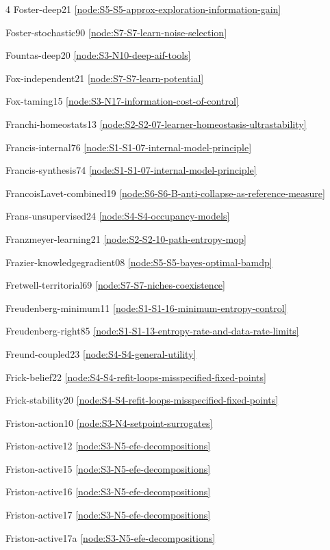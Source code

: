 \documentclass[10pt]{article}
\begin{document}
{\begin{multicols}{4}
Foster-deep21 \hfill \ref{node:S5-S5-approx-exploration-information-gain}\par
Foster-stochastic90 \hfill \ref{node:S7-S7-learn-noise-selection}\par
Fountas-deep20 \hfill \ref{node:S3-N10-deep-aif-tools}\par
Fox-independent21 \hfill \ref{node:S7-S7-learn-potential}\par
Fox-taming15 \hfill \ref{node:S3-N17-information-cost-of-control}\par
Franchi-homeostats13 \hfill \ref{node:S2-S2-07-learner-homeostasis-ultrastability}\par
Francis-internal76 \hfill \ref{node:S1-S1-07-internal-model-principle}\par
Francis-synthesis74 \hfill \ref{node:S1-S1-07-internal-model-principle}\par
FrancoisLavet-combined19 \hfill \ref{node:S6-S6-B-anti-collapse-as-reference-measure}\par
Frans-unsupervised24 \hfill \ref{node:S4-S4-occupancy-models}\par
Franzmeyer-learning21 \hfill \ref{node:S2-S2-10-path-entropy-mop}\par
Frazier-knowledgegradient08 \hfill \ref{node:S5-S5-bayes-optimal-bamdp}\par
Fretwell-territorial69 \hfill \ref{node:S7-S7-niches-coexistence}\par
Freudenberg-minimum11 \hfill \ref{node:S1-S1-16-minimum-entropy-control}\par
Freudenberg-right85 \hfill \ref{node:S1-S1-13-entropy-rate-and-data-rate-limits}\par
Freund-coupled23 \hfill \ref{node:S4-S4-general-utility}\par
Frick-belief22 \hfill \ref{node:S4-S4-refit-loops-misspecified-fixed-points}\par
Frick-stability20 \hfill \ref{node:S4-S4-refit-loops-misspecified-fixed-points}\par
Friston-action10 \hfill \ref{node:S3-N4-setpoint-surrogates}\par
Friston-active12 \hfill \ref{node:S3-N5-efe-decompositions}\par
Friston-active15 \hfill \ref{node:S3-N5-efe-decompositions}\par
Friston-active16 \hfill \ref{node:S3-N5-efe-decompositions}\par
Friston-active17 \hfill \ref{node:S3-N5-efe-decompositions}\par
Friston-active17a \hfill \ref{node:S3-N5-efe-decompositions}\par

\end{multicols}}
\end{document}
